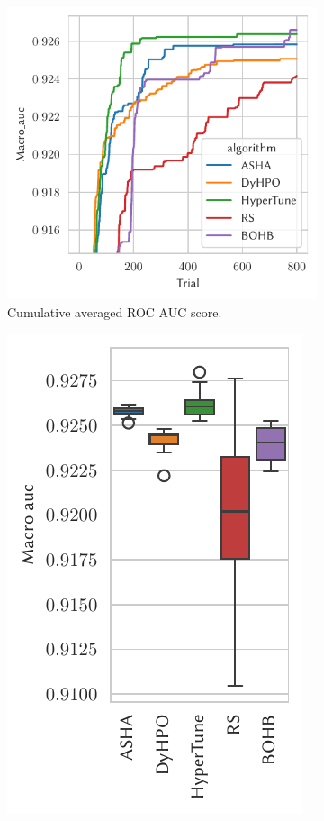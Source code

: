 \begin{figure}[H]
    \begin{subfigure}{.47\textwidth}
        \includegraphics[height=\plotheight]{img/real_exp/ptbxl_xResNet1d_plot.pdf}%
        \caption{Cumulative averaged ROC AUC score.}%
    \end{subfigure}%
    \begin{subfigure}{.26\textwidth}
        \includegraphics[height=\plotheight]{img/real_exp/ptbxl_xResNet1d_boxplot_half.pdf}%

\end{subfigure}
\end{figure}
